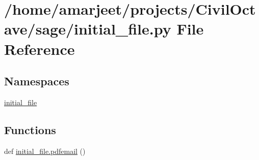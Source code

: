 \hypertarget{a00019}{}\section{/home/amarjeet/projects/\+Civil\+Octave/sage/initial\+\_\+file.py File Reference}
\label{a00019}
\subsection*{Namespaces}
\begin{DoxyCompactItemize}
\item 
 \hyperlink{a00037}{initial\+\_\+file}
\end{DoxyCompactItemize}
\subsection*{Functions}
\begin{DoxyCompactItemize}
\item 
def \hyperlink{a00037_a105b1aa7bf4db853b6f4d064ed224030}{initial\+\_\+file.\+pdfemail} ()
\end{DoxyCompactItemize}
